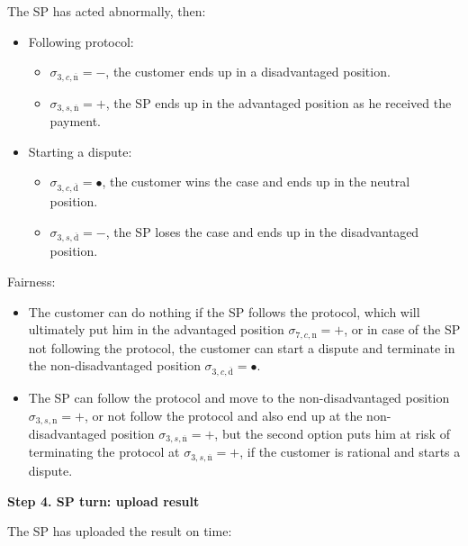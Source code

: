 \documentclass{ieeeaccess}
\begin{document}
The SP has acted abnormally, then:

\begin{itemize}
\item
  Following protocol:

  \begin{itemize}
  
  \item
    \(\sigma_{3, c, \overline{\mathrm{n}}} = -\), the customer ends up in a disadvantaged position.
  \item
    \(\sigma_{3, s, \overline{\mathrm{n}}} = +\), the SP ends up in the advantaged position as he received the payment. 
  \end{itemize}
\item
  Starting a dispute:

  \begin{itemize}
  
  \item
    \(\sigma_{3, c, \overline{\mathrm{d}}} = •\), the customer wins the case and ends up in the neutral position.
  \item
    \(\sigma_{3, s, \overline{\mathrm{d}}} = -\), the SP loses the case and ends up in the disadvantaged position. 
  \end{itemize}
\end{itemize}

Fairness:

\begin{itemize}

\item
  The customer can do nothing if the SP follows the protocol, which will ultimately put him in the advantaged position \(\sigma_{7, c, \mathrm{n}} = +\), or in case of the SP not following the protocol, the customer can start a dispute and terminate in the non-disadvantaged position \(\sigma_{3, c, \overline{\mathrm{d}}} = •\).
\item
  The SP can follow the protocol and move to the non-disadvantaged position \(\sigma_{3, s, \mathrm{n}} = +\), or not follow the protocol and also end up at the non-disadvantaged position \(\sigma_{3, s, \overline{\mathrm{n}}} = +\), but the second option puts him at risk of terminating the protocol at \(\sigma_{3, s, \overline{\mathrm{n}}} = +\), if the customer is rational and starts a dispute.
\end{itemize}

\noindent \textbf
{Step 4. SP turn: upload result}\label{step-4-publication-of-results}

The SP has uploaded the result on time:
\end{document}
